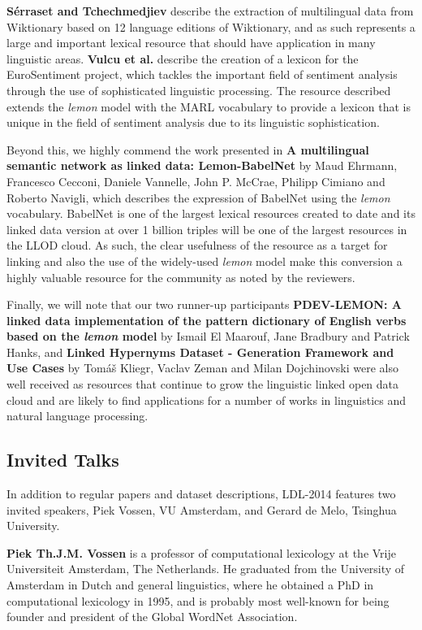 \textbf{Sérraset and Tchechmedjiev} describe the extraction of multilingual data from Wiktionary 
based on 12 language editions of Wiktionary, and as such represents a large and 
important lexical resource that should have application in many linguistic areas. 
\textbf{Vulcu et al.} describe the creation of a lexicon for the EuroSentiment project, which 
tackles the important field of sentiment analysis through the use of sophisticated 
linguistic processing. The resource described extends the \textit{lemon} model 
with the MARL vocabulary to provide a lexicon that is unique in the field of sentiment 
analysis due to its linguistic sophistication. 

Beyond this, we highly commend the work presented in \textbf{A multilingual semantic network as linked data: Lemon-BabelNet} by
Maud Ehrmann, Francesco Cecconi, Daniele Vannelle, John P. McCrae, Philipp Cimiano 
and Roberto Navigli, which describes the expression of BabelNet using the \textit{lemon} 
vocabulary. BabelNet is one of the largest lexical resources created to date and 
its linked data version at over 1 billion triples will be one of the largest resources 
in the LLOD cloud. As such, the clear usefulness of the resource as a target for 
linking and also the use of the widely-used \textit{lemon} model make this conversion 
a highly valuable resource for the community as noted by the reviewers. 

Finally, 
we will note that our two runner-up participants \textbf{PDEV-LEMON: A linked data implementation 
of the pattern dictionary of English verbs based on the \textit{lemon} model} 
by  Ismail El Maarouf, Jane Bradbury and Patrick Hanks, and \textbf{Linked Hypernyms Dataset - Generation Framework 
and Use Cases} by Tomáš Kliegr, Vaclav Zeman and Milan Dojchinovski were also well received as resources that 
continue to grow the linguistic linked open data cloud and are likely to find applications 
for a number of works in linguistics and natural language processing.

\subsection{Invited Talks}

In addition to regular papers and dataset descriptions, LDL-2014 features two invited speakers, Piek Vossen, VU Amsterdam, and Gerard de Melo, Tsinghua University.

\smallskip

\textbf{Piek Th.J.M. Vossen} is a professor of computational lexicology at the Vrije Universiteit Amsterdam, The Netherlands. He graduated from the University of Amsterdam in Dutch and general linguistics, where he obtained a PhD in computational lexicology in 1995, and is probably most well-known for being founder and president of the Global WordNet Association.

